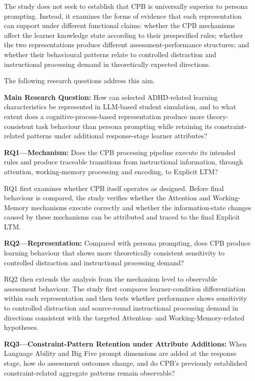 The study does not seek to establish that CPB is universally superior to persona prompting. Instead, it examines the forms of evidence that each representation can support under different functional claims: whether the CPB mechanisms affect the learner knowledge state according to their prespecified rules; whether the two representations produce different assessment-performance structures; and whether their behavioural patterns relate to controlled distraction and instructional processing demand in theoretically expected directions.

The following research questions address this aim.

\noindent\textbf{Main Research Question:} How can selected ADHD-related learning characteristics be represented in LLM-based student simulation, and to what extent does a cognitive-process-based representation produce more theory-consistent task behaviour than persona prompting while retaining its constraint-related patterns under additional response-stage learner attributes?

\noindent\textbf{RQ1---Mechanism:} Does the CPB processing pipeline execute its intended rules and produce traceable transitions from instructional information, through attention, working-memory processing and encoding, to Explicit LTM?

RQ1 first examines whether CPB itself operates as designed. Before final behaviour is compared, the study verifies whether the Attention and Working-Memory mechanisms execute correctly and whether the information-state changes caused by these mechanisms can be attributed and traced to the final Explicit LTM.

\noindent\textbf{RQ2---Representation:} Compared with persona prompting, does CPB produce learning behaviour that shows more theoretically consistent sensitivity to controlled distraction and instructional processing demand?

RQ2 then extends the analysis from the mechanism level to observable assessment behaviour. The study first compares learner-condition differentiation within each representation and then tests whether performance shows sensitivity to controlled distraction and source-round instructional processing demand in directions consistent with the targeted Attention- and Working-Memory-related hypotheses.

\noindent\textbf{RQ3---Constraint-Pattern Retention under Attribute Additions:} When Language Ability and Big Five prompt dimensions are added at the response stage, how do assessment outcomes change, and do CPB's previously established constraint-related aggregate patterns remain observable?

